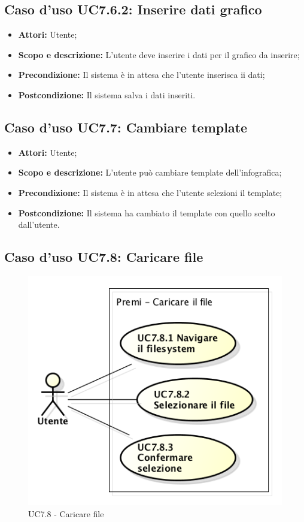 \subsection{Caso d'uso UC7.6.2: Inserire dati grafico}
\begin{itemize}
	\item \textbf{Attori:} Utente;
	\item \textbf{Scopo e descrizione:} L'utente deve inserire i dati per il grafico da inserire;
	\item \textbf{Precondizione:} Il sistema è in attesa che l'utente inserisca ii dati;
	\item \textbf{Postcondizione:} Il sistema salva i dati inseriti.
\end{itemize}


\subsection{Caso d'uso UC7.7: Cambiare template}
\begin{itemize}
	\item \textbf{Attori:} Utente;
	\item \textbf{Scopo e descrizione:} L'utente può cambiare template dell'infografica;
	\item \textbf{Precondizione:} Il sistema è in attesa che l'utente selezioni il template;
	\item \textbf{Postcondizione:} Il sistema ha cambiato il template con quello scelto dall'utente.
\end{itemize}


\subsection{Caso d'uso UC7.8: Caricare file}
\begin{figure}[h] 
	\centering 
	\includegraphics[scale=0.45] {img/UC7.8.png} 
	\caption{UC7.8 - Caricare file} 
\end{figure}

